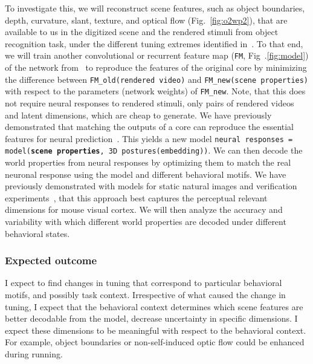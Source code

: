 \documentclass[B2,COG]{ercgrant}
\begin{document}
To investigate this, we will reconstruct scene features, such as object boundaries, depth, curvature, slant, texture, and optical flow (Fig.~\ref{fig:o2wp2}), that are available to us in the digitized scene and the rendered stimuli from object recognition task, under the different tuning extremes identified in~.
To that end, we will train another convolutional or recurrent feature map (\texttt{FM}, Fig~.\ref{fig:model}) of the network from~ to reproduce the features of the original core by minimizing the difference between 
    \texttt{FM\_old(rendered video)} and \texttt{FM\_new(scene properties)}
with respect to the parameters (network weights) of \texttt{FM\_new}. 
Note, that this does not require neural responses to rendered stimuli, only pairs of rendered videos and latent dimensions, which are cheap to generate. 
We have previously demonstrated that matching the outputs of a core can reproduce the essential features for neural prediction~\parencite{Safarani2021-yy}.
This yields a new model \texttt{neural responses = model(\textbf{scene properties}, 3D postures(embedding))}.
We can then decode the world properties from neural responses by optimizing them to match the real neuronal response using the model and different behavioral motifs.
We have previously demonstrated with models for static natural images and verification experiments~\parencite{Cobos2022-rr}, that this approach best captures the perceptual relevant dimensions for mouse visual cortex. 
We will then analyze the accuracy and variability with which different world properties are decoded under different behavioral states. 

\subsubsection{Expected outcome} 
I expect to find changes in tuning that correspond to particular behavioral motifs, and possibly task context.
Irrespective of what caused the change in tuning, I expect that the behavioral context determines which scene features are better decodable from the model, \ie decrease uncertainty in specific dimensions.
I expect these dimensions to be meaningful with respect to the behavioral context. 
For example, object boundaries or non-self-induced optic flow could be enhanced during running. 
\end{document}
